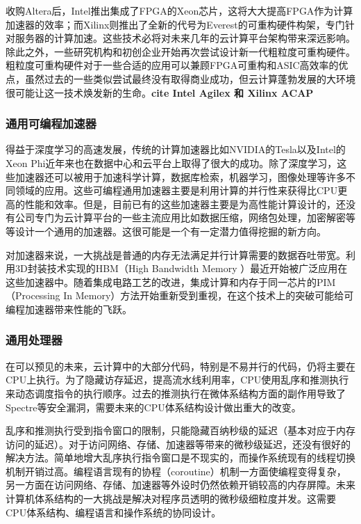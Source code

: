 收购Altera后，Intel推出集成了FPGA的Xeon芯片，这将大大提高FPGA作为计算加速器的效率；而Xilinx则推出了全新的代号为Everest的可重构硬件构架，专门针对服务器的计算加速。这些技术必将对未来几年的云计算平台架构带来深远影响。除此之外，一些研究机构和初创企业开始再次尝试设计新一代粗粒度可重构硬件。粗粒度可重构硬件对于一些合适的应用可以兼顾FPGA可重构和ASIC高效率的优点，虽然过去的一些类似尝试最终没有取得商业成功，但云计算蓬勃发展的大环境很可能让这一技术焕发新的生命。\textbf{cite Intel Agilex 和 Xilinx ACAP}

\subsubsection{通用可编程加速器}

得益于深度学习的高速发展，传统的计算加速器比如NVIDIA的Tesla以及Intel的Xeon Phi近年来也在数据中心和云平台上取得了很大的成功。除了深度学习，这些加速器还可以被用于加速科学计算，数据库检索，机器学习，图像处理等许多不同领域的应用。这些可编程通用加速器主要是利用计算的并行性来获得比CPU更高的性能和效率。但是，目前已有的这些加速器主要是为高性能计算设计的，还没有公司专门为云计算平台的一些主流应用比如数据压缩，网络包处理，加密解密等等设计一个通用的加速器。这很可能是一个有一定潜力值得挖掘的新方向。

对加速器来说，一大挑战是普通的内存无法满足并行计算需要的数据吞吐带宽。利用3D封装技术实现的HBM（High Bandwidth Memory ）最近开始被广泛应用在这些加速器中。随着集成电路工艺的改进，集成计算和内存于同一芯片的PIM（Processing In Memory）方法开始重新受到重视，在这个技术上的突破可能给可编程加速器带来性能的飞跃。

\subsubsection{通用处理器}

在可以预见的未来，云计算中的大部分代码，特别是不易并行的代码，仍将主要在CPU上执行。为了隐藏访存延迟，提高流水线利用率，CPU使用乱序和推测执行来动态调度指令的执行顺序。过去的推测执行在微体系结构方面的副作用导致了Spectre等安全漏洞，需要未来的CPU体系结构设计做出重大的改变。

乱序和推测执行受到指令窗口的限制，只能隐藏百纳秒级的延迟（基本对应于内存访问的延迟）。对于访问网络、存储、加速器等带来的微秒级延迟，还没有很好的解决方法。简单地增大乱序执行指令窗口是不现实的，而操作系统现有的线程切换机制开销过高。编程语言现有的协程（coroutine）机制一方面使编程变得复杂，另一方面在访问网络、存储、加速器等外设时仍然依赖开销较高的内存屏障。未来计算机体系结构的一大挑战是解决对程序员透明的微秒级细粒度并发。这需要CPU体系结构、编程语言和操作系统的协同设计。


